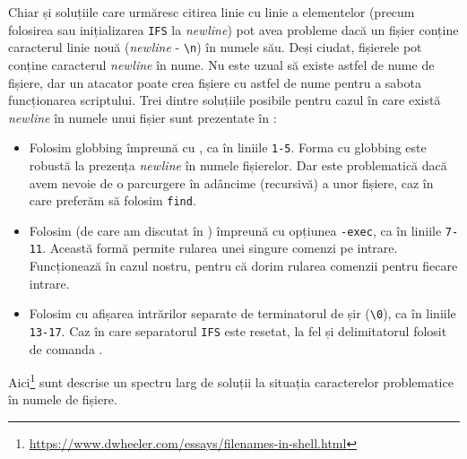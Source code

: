 Chiar și soluțiile care urmăresc citirea linie cu linie a elementelor (precum folosirea  sau inițializarea \texttt{IFS} la \textit{newline}) pot avea probleme dacă un fișier conține caracterul linie nouă (\textit{newline} - \texttt{\textbackslash{}n}) în numele său.
Deși ciudat, fișierele pot conține caracterul \textit{newline} în nume.
Nu este uzual să existe astfel de nume de fișiere, dar un atacator poate crea fișiere cu astfel de nume pentru a sabota funcționarea scriptului.
Trei dintre soluțiile posibile pentru cazul în care există \textit{newline} în numele unui fișier sunt prezentate în :
\begin{itemize}
  \item Folosim globbing împreună cu , ca în liniile \texttt{1-5}.
    Forma cu globbing este robustă la prezența \textit{newline} în numele fișierelor.
    Dar este problematică dacă avem nevoie de o parcurgere în adâncime (recursivă) a unor fișiere, caz în care preferăm să folosim \texttt{find}.
  \item Folosim  (de care am discutat în ) împreună cu opțiunea \texttt{-exec}, ca în liniile \texttt{7-11}.
    Această formă permite rularea unei singure comenzi pe intrare.
    Funcționează în cazul nostru, pentru că dorim rularea comenzii  pentru fiecare intrare.
  \item Folosim  cu afișarea intrărilor separate de terminatorul de șir (\texttt{\textbackslash{}0}), ca în liniile \texttt{13-17}.
    Caz în care separatorul \texttt{IFS} este resetat, la fel și delimitatorul folosit de comanda .
\end{itemize}

Aici\footnote{\url{https://www.dwheeler.com/essays/filenames-in-shell.html}} sunt descrise un spectru larg de soluții la situația caracterelor problematice în numele de fișiere.


